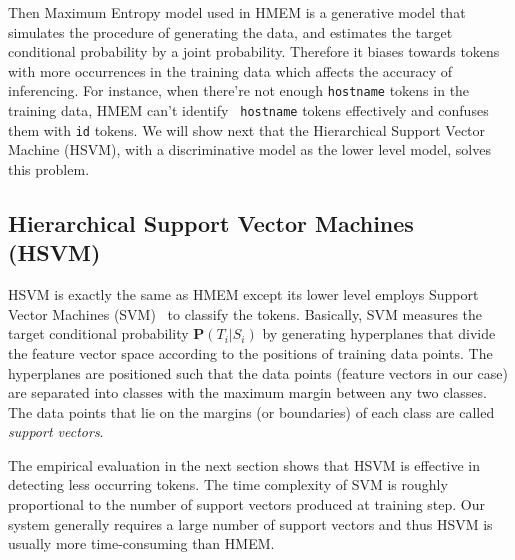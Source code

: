 Then Maximum Entropy model used in HMEM is a
generative model that simulates the procedure of generating the data, and
estimates the target conditional probability by a joint
probability. Therefore it biases towards tokens with more
occurrences in the training data which affects the accuracy of inferencing. 
For instance, when there're not enough
{\tt hostname} tokens in the training data, HMEM can't identify {\tt
hostname} tokens effectively and confuses them with {\tt id}
tokens. We will show next that the Hierarchical
Support Vector Machine (HSVM), with a discriminative model as the
lower level model, solves this problem.

\subsection{Hierarchical Support Vector Machines (HSVM)}\label{subsec:hsvm}

HSVM is exactly the same as HMEM except its lower
level employs Support Vector Machines (SVM)~\cite{CC01a} to classify
the tokens. 
Basically, SVM measures the target conditional probability $\mathbf{P}(T_i|S_i)$ 
by generating hyperplanes that divide the feature vector space according to the
positions of training data points. The hyperplanes are positioned such that the
data points (feature vectors in our case) are separated into classes with
the maximum margin between any two classes. The data points that lie on
the margins (or boundaries) of each class are called {\em support vectors}. 

The empirical evaluation in the next section shows that HSVM is effective
in detecting less occurring tokens. The time complexity of SVM 
is roughly proportional to the number of support vectors produced at training
step. Our system generally requires a large number of support vectors 
and thus HSVM is usually more time-consuming than HMEM.
